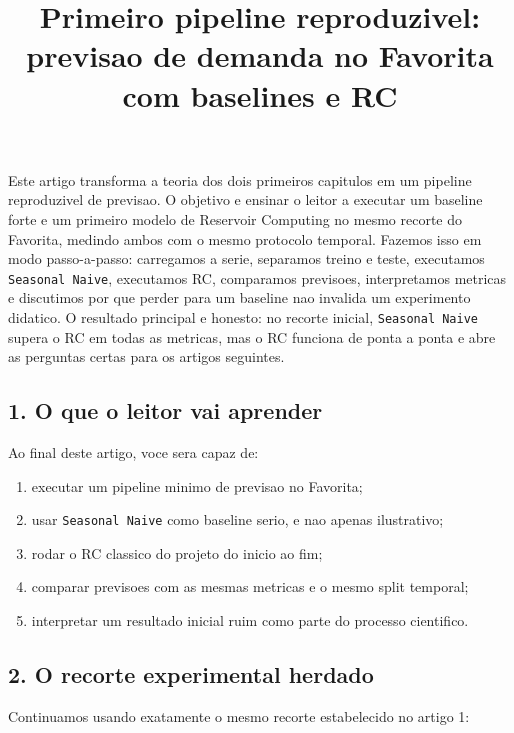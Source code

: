 \documentclass[12pt]{article}
\title{Primeiro pipeline reproduzivel: previsao de demanda no Favorita com baselines e RC}
\author{}
\providecommand{\tightlist}{%
          \setlength{\itemsep}{0pt}\setlength{\parskip}{0pt}}
\begin{document}
        \maketitle

        \begin{resumo}
        Este artigo transforma a teoria dos dois primeiros capitulos em um pipeline reproduzivel de previsao. O objetivo e ensinar o leitor a executar um baseline forte e um primeiro modelo de Reservoir Computing no mesmo recorte do Favorita, medindo ambos com o mesmo protocolo temporal. Fazemos isso em modo passo-a-passo: carregamos a serie, separamos treino e teste, executamos \texttt{Seasonal\ Naive}, executamos RC, comparamos previsoes, interpretamos metricas e discutimos por que perder para um baseline nao invalida um experimento didatico. O resultado principal e honesto: no recorte inicial, \texttt{Seasonal\ Naive} supera o RC em todas as metricas, mas o RC funciona de ponta a ponta e abre as perguntas certas para os artigos seguintes.
        \end{resumo}

        \subsection{1. O que o leitor vai aprender}\label{1-o-que-o-leitor-vai-aprender}

Ao final deste artigo, voce sera capaz de:

\begin{enumerate}
\def\labelenumi{\arabic{enumi}.}
\tightlist
\item
  executar um pipeline minimo de previsao no Favorita;
\item
  usar \texttt{Seasonal\ Naive} como baseline serio, e nao apenas ilustrativo;
\item
  rodar o RC classico do projeto do inicio ao fim;
\item
  comparar previsoes com as mesmas metricas e o mesmo split temporal;
\item
  interpretar um resultado inicial ruim como parte do processo cientifico.
\end{enumerate}

\subsection{2. O recorte experimental herdado}\label{2-o-recorte-experimental-herdado}

Continuamos usando exatamente o mesmo recorte estabelecido no artigo 1:
\end{document}
